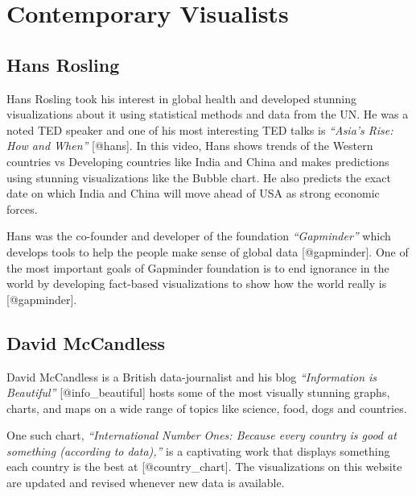 \documentclass[]{book}
\theoremstyle{definition}
\theoremstyle{definition}
\theoremstyle{definition}
\theoremstyle{remark}
\begin{document}
\section{Contemporary Visualists}\label{contemporary-visualists}

\subsection{Hans Rosling}\label{hans-rosling}

Hans Rosling took his interest in global health and developed stunning
visualizations about it using statistical methods and data from the UN.
He was a noted TED speaker and one of his most interesting TED talks is
\emph{``Asia's Rise: How and When''} {[}@hans{]}. In this video, Hans
shows trends of the Western countries vs Developing countries like India
and China and makes predictions using stunning visualizations like the
Bubble chart. He also predicts the exact date on which India and China
will move ahead of USA as strong economic forces.

Hans was the co-founder and developer of the foundation
\emph{``Gapminder''} which develops tools to help the people make sense
of global data {[}@gapminder{]}. One of the most important goals of
Gapminder foundation is to end ignorance in the world by developing
fact-based visualizations to show how the world really is
{[}@gapminder{]}.

\subsection{David McCandless}\label{david-mccandless}

David McCandless is a British data-journalist and his blog
\emph{``Information is Beautiful''} {[}@info\_beautiful{]} hosts some of
the most visually stunning graphs, charts, and maps on a wide range of
topics like science, food, dogs and countries.

One such chart, \emph{``International Number Ones: Because every country
is good at something (according to data),''} is a captivating work that
displays something each country is the best at {[}@country\_chart{]}.
The visualizations on this website are updated and revised whenever new
data is available.
\end{document}
